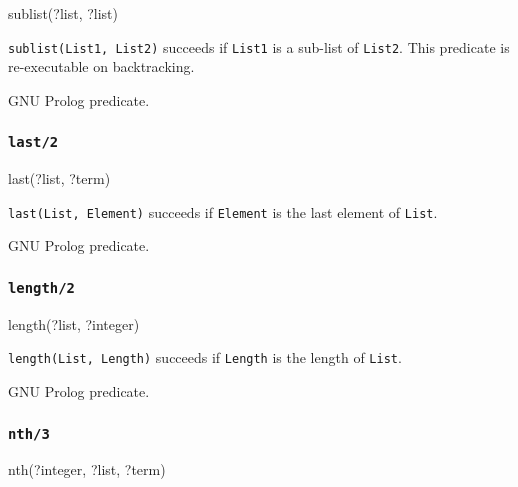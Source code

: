 \begin{TemplatesOneCol}
sublist(?list, ?list)

\end{TemplatesOneCol}

\Description

\texttt{sublist(List1, List2)} succeeds if \texttt{List1} is a sub-list of
\texttt{List2}. This predicate is re-executable on backtracking.

\PlErrorsNone

\Portability

GNU Prolog predicate.

\subsubsection{\texttt{last/2}}

\begin{TemplatesOneCol}
last(?list, ?term)

\end{TemplatesOneCol}

\Description

\texttt{last(List, Element)} succeeds if \texttt{Element} is the last element
of \texttt{List}.

\PlErrorsNone

\Portability

GNU Prolog predicate.

\subsubsection{\texttt{length/2}}

\begin{TemplatesOneCol}
length(?list, ?integer)

\end{TemplatesOneCol}

\Description

\texttt{length(List, Length)} succeeds if \texttt{Length} is the length of
\texttt{List}.

\PlErrorsNone

\Portability

GNU Prolog predicate.

\subsubsection{\texttt{nth/3}}

\begin{TemplatesOneCol}
nth(?integer, ?list, ?term)

\end{TemplatesOneCol}

